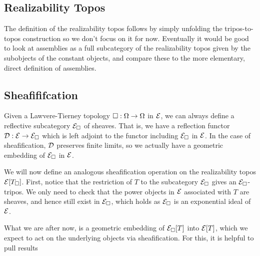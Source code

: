 \documentclass[11pt]{article}
\begin{document}
\subsection{Realizability Topos}%
\label{sub:realizability-topos}

The definition of the realizability topos follows by simply
unfolding the tripos-to-topos construction so we don't focus on it for now.
%
Eventually it would be good to look at assemblies as a full subcategory of the
realizability topos given by the subobjects of the constant objects, and
compare these to the more elementary, direct definition of assemblies.

\subsection{Sheafififcation}


Given a Lawvere-Tierney topology \(\Box : \Omega \to \Omega\) in \(\mathcal{E}\), we
can always define a reflective subcategory \(\mathcal{E}_\Box\) of sheaves.
%
That is, we have a reflection functor \(\mathcal{D} : \mathcal{E} \to \mathcal{E}_\Box\) which is
left adjoint to the functor including \(\mathcal{E}_\Box\) in \(\mathcal{E}\).
%
In the case of sheafification, \(\mathcal{D}\) preserves finite limits,
so we actually have a geometric embedding of \(\mathcal{E}_\Box\) in \(\mathcal{E}\).


We will now define an analogous sheafification operation on
the realizability topos \({\mathcal{E}}[{T_\Box}]\).
%
First, notice that the restriction of \(T\) to the subcategory \(\mathcal{E}_\Box\) gives an
\(\mathcal{E}_\Box\)-tripos.
%
We only need to check that the power objects in \(\mathcal{E}\) associated with \(T\) are
sheaves, and hence still exist in \(\mathcal{E}_\Box\), which holds as \(\mathcal{E}_\Box\) is an
exponential ideal of \(\mathcal{E}\).

What we are after now, is a geometric embedding of \({\mathcal{E}_\Box}[{T}]\) into
\({\mathcal{E}}[{T}]\), which we expect to act on the underlying objects via
sheafification.
%
For this, it is helpful to pull results


%
\end{document}
